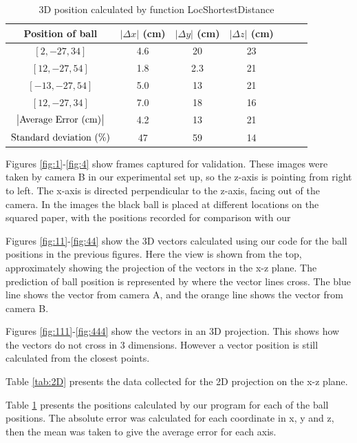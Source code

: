 \documentclass{article}
\begin{document}
\begin{table}[h!]
\centering
\begin{tabular}{c c c c c c c} 
\toprule 
Position of ball & $\left| \Delta x \right|$ (cm) & $\left| \Delta y  \right|$ (cm) & $\left| \Delta z\right|$ (cm)\\[0.5ex] 
\midrule
$[2, -27, 34]$ &  4.6 & 20 & 23 \\
$[12, -27, 54]$  & 1.8  & 2.3 & 21\\
$[-13, -27, 54]$ & 5.0  & 13 & 21\\
$[12, -27, 34]$ & 7.0  & 18 & 16\\
\midrule
\midrule

$\left| \textnormal{Average Error (cm)} \right|$  & 4.2 & 13 & 21\\
[0.8ex]
$\textnormal{Standard deviation (\%)} $  & 47 & 59 &	14

 
\end{tabular}
\caption{3D position calculated by function LocShortestDistance}
\label{tab:3D}
\end{table}

Figures \ref{fig:1}-\ref{fig:4} show frames captured for validation. These images were taken by camera B in our experimental set up, so the z-axis is pointing from right to left. The x-axis is directed perpendicular to the z-axis, facing out of the camera. In the images the black ball is placed at different locations on the squared paper, with the positions recorded for comparison with our 

Figures \ref{fig:11}-\ref{fig:44} show the 3D vectors calculated using our code for the ball positions in the previous figures. Here the view is shown from the top, approximately showing the projection of the vectors in the x-z plane. The prediction of ball position is represented by where the vector lines cross. The blue line shows the vector from camera A, and the orange line shows the vector from camera B.

Figures \ref{fig:111}-\ref{fig:444} show the vectors in an 3D projection. This shows how the vectors do not cross in 3 dimensions. However a vector position is still calculated from the closest points.

Table \ref{tab:2D} presents the data collected for the 2D projection on the x-z plane. 

Table \ref{tab:3D} presents the positions calculated by our program for each of the ball positions. The absolute error was calculated for each coordinate in x, y and z, then the mean was taken to give the average error for each axis. 
\end{document}
